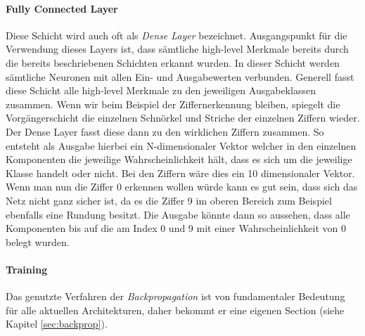 \paragraph{Fully Connected Layer}
Diese Schicht wird auch oft als \emph{Dense Layer} bezeichnet. Ausgangspunkt für die Verwendung dieses Layers ist, dass sämtliche high-level Merkmale bereits durch die bereits beschriebenen Schichten erkannt wurden. In dieser Schicht werden sämtliche Neuronen mit allen Ein- und Ausgabewerten verbunden. Generell fasst diese Schicht alle high-level Merkmale zu den jeweiligen Ausgabeklassen zusammen. Wenn wir beim Beispiel der Ziffernerkennung bleiben, spiegelt die Vorgängerschicht die einzelnen Schnörkel und Striche der einzelnen Ziffern wieder. Der Dense Layer fasst diese dann zu den wirklichen Ziffern zusammen. So entsteht als Ausgabe hierbei ein N-dimensionaler Vektor welcher in den einzelnen Komponenten die jeweilige Wahrscheinlichkeit hält, dass es sich um die jeweilige Klasse handelt oder nicht. Bei den Ziffern wäre dies ein 10 dimensionaler Vektor. Wenn man nun die Ziffer 0 erkennen wollen würde kann es gut sein, dass sich das Netz \glqq nicht ganz sicher \grqq ist, da es die Ziffer 9 im oberen Bereich zum Beispiel ebenfalls eine Rundung besitzt. Die Ausgabe könnte dann so aussehen, dass alle Komponenten bis auf die am Index 0 und 9 mit einer Wahrscheinlichkeit von 0 belegt wurden. 

\paragraph{Training} 
Das genutzte Verfahren der \emph{Backpropagation} ist von fundamentaler Bedeutung für alle aktuellen Architekturen, daher bekommt er eine eigenen Section (siehe Kapitel \ref{sec:backprop}). 
